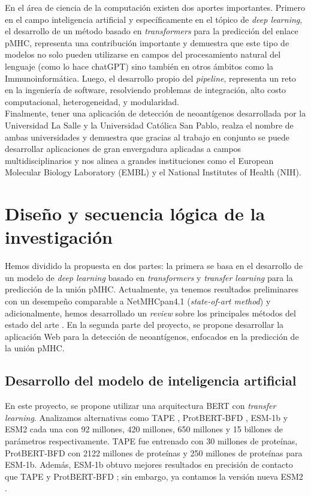 \documentclass[a4paper]{article}
\begin{document}
En el área de ciencia de la computación existen dos aportes importantes. Primero en el campo inteligencia artificial y específicamente en el tópico de \textit{deep learning}, el desarrollo de un método basado en \textit{transformers} para la predicción del enlace pMHC, representa una contribución importante  y demuestra que este tipo de modelos no solo pueden utilizarse en campos del procesamiento natural del lenguaje (como lo hace chatGPT) sino también en otros ámbitos como la Immunoinformática. Luego, el desarrollo propio del \textit{pipeline}, representa un reto en la ingeniería de software, resolviendo problemas de integración, alto costo computacional, heterogeneidad, y modularidad.   \\

Finalmente, tener una aplicación de detección de neoantígenos desarrollada por la Universidad La Salle y la Universidad Católica San Pablo, realza el nombre de ambas universidades y demuestra que gracias al trabajo en conjunto se puede desarrollar aplicaciones de gran envergadura aplicadas a campos multidisciplinarios y nos alinea a grandes instituciones como el European Molecular Biology Laboratory (EMBL) y el National Institutes of Health (NIH).




\section{Diseño y secuencia lógica de la investigación} 

Hemos dividido la propuesta en dos partes: la primera se basa en el desarrollo de un modelo de \textit{deep learning} basado en \textit{transformers} y \textit{transfer learning} para la predicción de la unión pMHC. Actualmente, ya tenemos resultados preliminares con un desempeño comparable a NetMHCpan4.1 (\textit{state-of-art method}) \citep{arceda2023neoantigen} y adicionalmente, hemos desarrollado un \textit{review} sobre los principales métodos del estado del arte \citep{machaca2023deep}. En la segunda parte del proyecto, se propone desarrollar la aplicación Web para la detección de neoantígenos, enfocados en la predicción de la unión pMHC.

\subsection{Desarrollo del modelo de inteligencia artificial}

En este proyecto, se propone utilizar una arquitectura BERT con \textit{transfer learning}. Analizamos alternativas como TAPE \citep{rao2019evaluating}, ProtBERT-BFD \citep{elnaggar2021prottrans}, ESM-1b \citep{rives2021biological} y ESM2 \citep{lin2023evolutionary} cada una con 92 millones, 420 millones, 650 millones y 15 billones de parámetros respectivamente. TAPE fue entrenado con 30 millones de proteínas, ProtBERT-BFD con 2122 millones de proteínas y 250 millones de proteínas para ESM-1b. Además, ESM-1b obtuvo mejores resultados en precisión de contacto que TAPE y ProtBERT-BFD \citep{rives2021biological}; sin embargo, ya contamos la versión nueva ESM2 \citep{lin2023evolutionary}.\\
\end{document}
